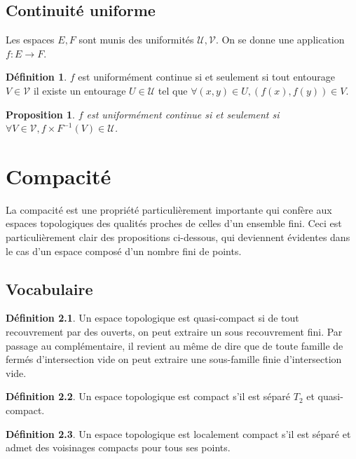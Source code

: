 \documentclass[a4paper, 11pt, french]{book}
\theoremstyle{plain} %
\newtheorem{proposition}{Proposition}
\theoremstyle{definition} %
\newtheorem{definition}{Définition}
\theoremstyle{remark} %
\newcommand{\1}{\mathds{1}}
\newcommand{\inv}[1]{#1^{-1}}
\newcommand{\scr}[1]{\mathscr{#1}}
\begin{document}
\section{Continuité uniforme}

Les espaces $E, F$ sont munis des uniformités $\scr{U}, \scr{V}$.
On se donne une application $f:E\rightarrow F$.

\begin{definition}
	$f$ est uniformément continue si et seulement si tout entourage $V\in\scr{V}$ il existe un entourage $U\in\scr{U}$ tel que $\forall (x, y)\in U, (f(x), f(y))\in V$.
\end{definition}

\begin{proposition}
	$f$ est uniformément continue si et seulement si $\forall V\in\scr{V}, \inv{f\times F}(V)\in\scr{U}$.
\end{proposition}

\chapter{Compacité}

La compacité est une propriété particulièrement importante qui confère aux espaces topologiques des qualités proches de celles d’un ensemble fini.
Ceci est particulièrement clair des propositions ci-dessous, qui deviennent évidentes dans le cas d’un espace composé d’un nombre fini de points.

\section{Vocabulaire}

\begin{definition}
	Un espace topologique est quasi-compact si de tout recouvrement par des ouverts, on peut extraire un sous recouvrement fini.
	Par passage au complémentaire, il revient au même de dire que de toute famille de fermés d’intersection vide on peut extraire une sous-famille finie d’intersection vide.
\end{definition}

\begin{definition}
	Un espace topologique est compact s'il est séparé $T_2$ et quasi-compact.
\end{definition}

\begin{definition}
	Un espace topologique est localement compact s'il est séparé et admet des voisinages compacts pour tous ses points.
\end{definition}
\end{document}
